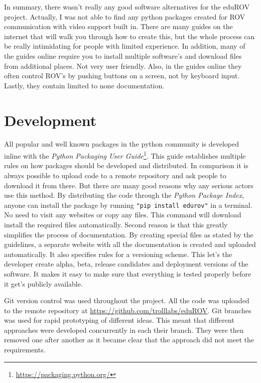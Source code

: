 In summary, there wasn't really any good software alternatives for the eduROV project. Actually, I was not able to find any python packages created for ROV communication with video support built in. There are many guides on the internet that will walk you through how to create this, but the whole process can be really intimidating for people with limited experience. In addition, many of the guides online require you to install multiple software's and download files from additional places. Not very user friendly. Also, in the guides online they often control ROV's by pushing buttons on a screen, not by keyboard input. Lastly, they contain limited to none documentation.

\section{Development}

All popular and well known packages in the python community is developed inline with the \emph{Python Packaging User Guide}\footnote{\url{https://packaging.python.org/}}. This guide establishes multiple rules on how packages should be developed and distributed. In comparison it is always possible to upload code to a remote repository and ask people to download it from there. But there are many good reasons why any serious actors use this method. By distributing the code through the \emph{Python Package Index}, anyone can install the package by running \texttt{"pip install edurov"} in a terminal. No need to visit any websites or copy any files. This command will download install the required files automatically. Second reason is that this greatly simplifies the process of documentation. By creating special files as stated by the guidelines, a separate website with all the documentation is created and uploaded automatically. It also specifies rules for a versioning scheme. This let's the developer create alpha, beta, release candidates and deployment versions of the software. It makes it easy to make sure that everything is tested properly before it get's publicly available.

Git version control was used throughout the project. All the code was uploaded to the remote repository at \url{https://github.com/trolllabs/eduROV}. Git branches was used for rapid prototyping of different ideas. This meant that different approaches were developed concurrently in each their branch. They were then removed one after another as it became clear that the approach did not meet the requirements.

